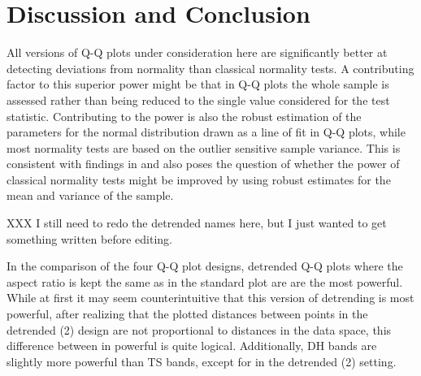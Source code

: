 \documentclass[12pt]{article}\usepackage[]{graphicx}\usepackage[]{color}
\newcommand{\al}[1]{{\color{ForestGreen} #1}}
\begin{document}
\section{Discussion and Conclusion}\label{sec:discussion}

\al{
All versions of Q-Q plots under consideration here are significantly better at detecting deviations from normality than classical normality tests. A contributing factor to this superior power might be  that in  Q-Q plots the whole sample is assessed rather than being reduced to the single value considered for the test statistic. 
Contributing to the power is also the robust estimation of the parameters for the normal distribution drawn as a line of fit in  Q-Q plots, while most normality tests are based on the outlier sensitive sample variance. %
This is consistent with findings in \citet{buja:2013} and  also poses the question of whether the power of classical normality tests might  be improved by using robust estimates for the mean and variance of the sample. 


XXX I still need to redo the detrended names here, but I just wanted to get something written before editing.

In the comparison of the four Q-Q plot designs, detrended Q-Q plots where the aspect ratio is kept the same as in the standard plot are are the most powerful. While at first it may seem counterintuitive that this version of detrending is most powerful, after realizing that the plotted distances between points in the detrended (2) design are not proportional to distances in the data space, this difference between in powerful is quite logical. Additionally, DH bands are slightly more powerful than TS bands, except for in the detrended (2) setting.
}
\end{document}
